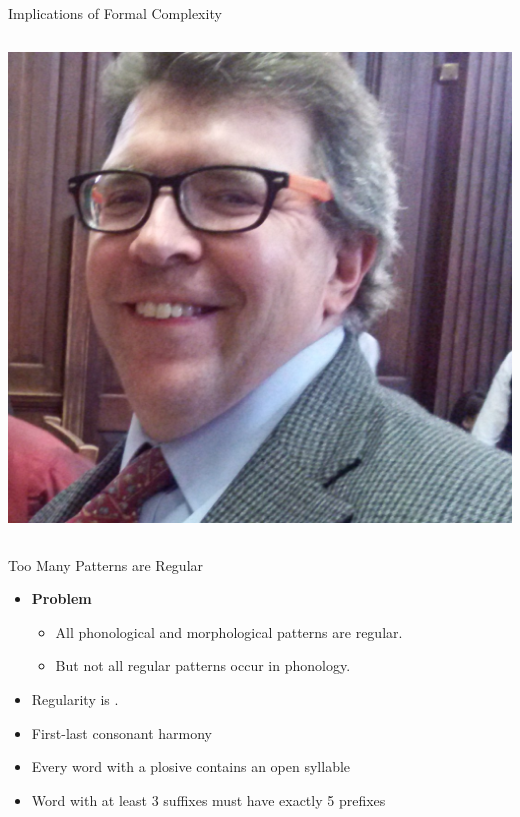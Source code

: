 \documentclass[xcolor={usenames,svgnames,x11names,table}]{beamer}
\begin{document}
\begin{frame}{Implications of Formal Complexity}
\begin{columns}
        \bigskip
        \includegraphics[width=1\linewidth]{./img/idsardi}\\
    \end{columns}
\end{frame}

\begin{frame}{Too Many Patterns are Regular}
    \begin{itemize}
        \item \textbf{Problem}
            \begin{itemize}
                \item All phonological and morphological patterns are regular.
                \item But not all regular patterns occur in phonology.
            \end{itemize}
        \item Regularity is .
    \end{itemize}
    \pause
    \begin{example}
        \begin{itemize}
            \item First-last consonant harmony
            \item Every word with a plosive contains an open syllable
            \item Word with at least 3 suffixes must have exactly 5 prefixes
        \end{itemize}
    \end{example}
\end{frame}
\end{document}
